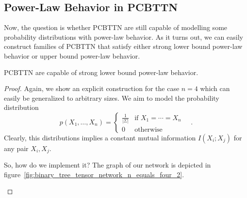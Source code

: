 \documentclass[../../main.tex]{subfiles}
\begin{document}
    \subsection{Power-Law Behavior in PCBTTN}
    Now, the question is whether PCBTTN are still capable of modelling some probability distributions with power-law behavior. As it turns out, we can easily construct families of PCBTTN that satisfy either strong lower bound power-law behavior or upper bound power-law behavior.

    \begin{theorem}
        PCBTTN are capable of strong lower bound power-law behavior.
    \end{theorem}
    \begin{proof}
        Again, we show an explicit construction for the case $n = 4$ which can easily be generalized to arbitrary sizes. We aim to model the probability distribution
        \[
            p(X_1, \dots, X_n) =
            \begin{cases}
                \frac{1}{|\Sigma|} & \text{if } X_1 = \cdots = X_n \\
                0 & \text{otherwise}
            \end{cases}
            \quad .
        \]
        Clearly, this distributions implies a constant mutual information $I(X_i; X_j)$ for any pair $X_i, X_j$.

        So, how do we implement it? The graph of our network is depicted in figure~\ref{fig:binary_tree_tensor_network_n_equals_four_2}.
        \begin{figure}[h]
            \centering
\end{figure}
\end{proof}
\end{document}

